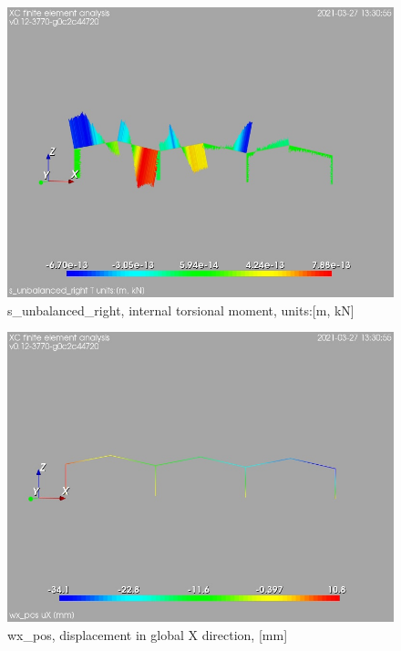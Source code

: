 \begin{figure}
\begin{center}
\includegraphics[width=\linewidth]{calc_results/sole_zeinali/text/graphics/resSimplLC/s_unbalanced_rightallMemberSetT}
\caption{s_unbalanced_right, internal torsional moment, units:[m, kN]}
\end{center}
\end{figure}
\cleardoublepage
\begin{figure}
\begin{center}
\includegraphics[width=\linewidth]{calc_results/sole_zeinali/text/graphics/resSimplLC/wx_postotaluX}
\caption{wx_pos, displacement in global X direction, [mm]}
\end{center}
\end{figure}
